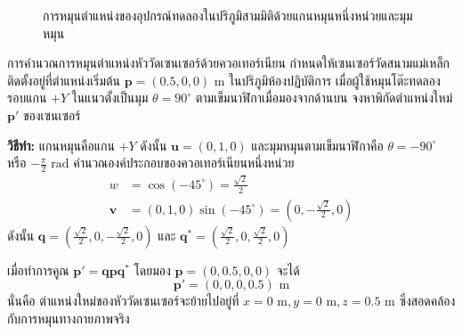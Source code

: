 \begin{figure}[htbp]
\centering
{}
\caption{การหมุนตำแหน่งของอุปกรณ์ทดลองในปริภูมิสามมิติด้วยแกนหมุนหนึ่งหน่วยและมุมหมุน}
\label{fig:quaternion_rotation}
\end{figure}

\begin{workedexamplebox}{การคำนวณการหมุนตำแหน่งหัววัดเซนเซอร์ด้วยควอเทอร์เนียน}
กำหนดให้เซนเซอร์วัดสนามแม่เหล็กติดตั้งอยู่ที่ตำแหน่งเริ่มต้น $\mathbf{p} = (0.5, 0, 0)\text{ m}$ ในปริภูมิห้องปฏิบัติการ เมื่อผู้ใช้หมุนโต๊ะทดลองรอบแกน $+Y$ ในแนวตั้งเป็นมุม $\theta = 90^\circ$ ตามเข็มนาฬิกาเมื่อมองจากด้านบน จงหาพิกัดตำแหน่งใหม่ $\mathbf{p}'$ ของเซนเซอร์

\textbf{วิธีทำ:}
แกนหมุนคือแกน $+Y$ ดังนั้น $\mathbf{u} = (0, 1, 0)$ และมุมหมุนตามเข็มนาฬิกาคือ $\theta = -90^\circ$ หรือ $-\frac{\pi}{2}\text{ rad}$
คำนวณองค์ประกอบของควอเทอร์เนียนหนึ่งหน่วย
\begin{align}
w &= \cos(-45^\circ) = \frac{\sqrt{2}}{2} \\
\mathbf{v} &= (0, 1, 0) \sin(-45^\circ) = \left(0, -\frac{\sqrt{2}}{2}, 0\right)
\end{align}
ดังนั้น $\mathbf{q} = \left(\frac{\sqrt{2}}{2}, 0, -\frac{\sqrt{2}}{2}, 0\right)$ และ $\mathbf{q}^* = \left(\frac{\sqrt{2}}{2}, 0, \frac{\sqrt{2}}{2}, 0\right)$

เมื่อทำการคูณ $\mathbf{p}' = \mathbf{q} \mathbf{p} \mathbf{q}^*$ โดยมอง $\mathbf{p} = (0, 0.5, 0, 0)$ จะได้
\begin{equation}
\mathbf{p}' = (0, 0, 0, 0.5)\text{ m}
\end{equation}
นั่นคือ ตำแหน่งใหม่ของหัววัดเซนเซอร์จะย้ายไปอยู่ที่ $x = 0\text{ m}, y = 0\text{ m}, z = 0.5\text{ m}$ ซึ่งสอดคล้องกับการหมุนทางกายภาพจริง
\end{workedexamplebox}

